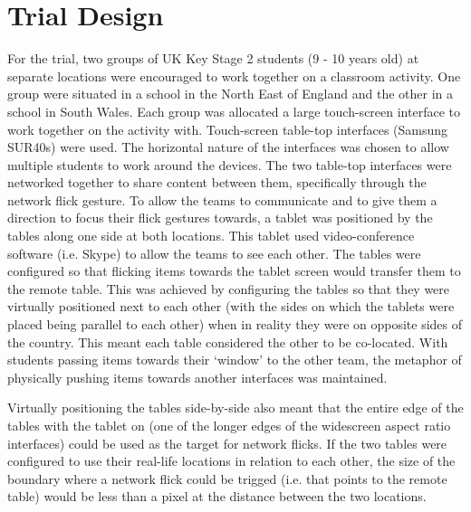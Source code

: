 \documentclass[a4paper,11pt]{article}
\begin{document}
\section{Trial Design}

For the trial, two groups of UK Key Stage 2 students (9 - 10 years old) at separate locations were encouraged to work together on a classroom activity.
One group were situated in a school in the North East of England and the other in a school in South Wales.
Each group was allocated a large touch-screen interface to work together on the activity with.
Touch-screen table-top interfaces (Samsung SUR40s) were used.
The horizontal nature of the interfaces was chosen to allow multiple students to work around the devices.
The two table-top interfaces were networked together to share content between them, specifically through the network flick gesture.
To allow the teams to communicate and to give them a direction to focus their flick gestures towards, a tablet was positioned by the tables along one side at both locations.
This tablet used video-conference software (i.e. Skype) to allow the teams to see each other.
The tables were configured so that flicking items towards the tablet screen would transfer them to the remote table.
This was achieved by configuring the tables so that they were virtually positioned next to each other (with the sides on which the tablets were placed being parallel to each other) when in reality they were on opposite sides of the country.
This meant each table considered the other to be co-located.
With students passing items towards their `window' to the other team, the metaphor of physically pushing items towards another interfaces was maintained.

Virtually positioning the tables side-by-side also meant that the entire edge of the tables with the tablet on (one of the longer edges of the widescreen aspect ratio interfaces) could be used as the target for network flicks.
If the two tables were configured to use their real-life locations in relation to each other, the size of the boundary where a network flick could be trigged (i.e. that points to the remote table) would be less than a pixel at the distance between the two locations.
\end{document}
